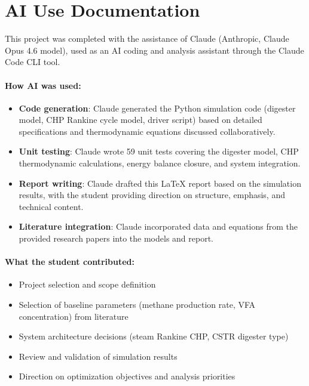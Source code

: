 \documentclass[12pt, letterpaper]{article}
\begin{document}
\section*{AI Use Documentation}

This project was completed with the assistance of Claude (Anthropic, Claude Opus 4.6 model), used as an AI coding and analysis assistant through the Claude Code CLI tool.

\paragraph{How AI was used:}
\begin{itemize}[noitemsep]
  \item \textbf{Code generation}: Claude generated the Python simulation code (digester model, CHP Rankine cycle model, driver script) based on detailed specifications and thermodynamic equations discussed collaboratively.
  \item \textbf{Unit testing}: Claude wrote 59 unit tests covering the digester model, CHP thermodynamic calculations, energy balance closure, and system integration.
  \item \textbf{Report writing}: Claude drafted this LaTeX report based on the simulation results, with the student providing direction on structure, emphasis, and technical content.
  \item \textbf{Literature integration}: Claude incorporated data and equations from the provided research papers into the models and report.
\end{itemize}

\paragraph{What the student contributed:}
\begin{itemize}[noitemsep]
  \item Project selection and scope definition
  \item Selection of baseline parameters (methane production rate, VFA concentration) from literature
  \item System architecture decisions (steam Rankine CHP, CSTR digester type)
  \item Review and validation of simulation results
  \item Direction on optimization objectives and analysis priorities
\end{itemize}
\end{document}
